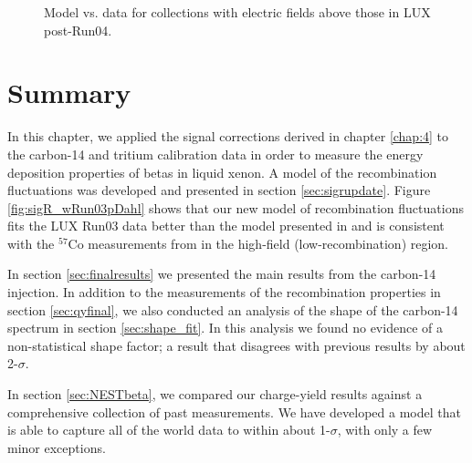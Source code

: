 \begin{figure}[!h]
\begin{subfigure}{0.5\linewidth}
\caption{}
\end{subfigure}
\caption{Model vs. data for collections with electric fields above those in LUX post-Run04.}
\label{fig:betamod_highfield}
\end{figure}

\clearpage
\section{Summary}
In this chapter, we applied the signal corrections derived in chapter \ref{chap:4} to the carbon-14 and tritium calibration data in order to measure the energy deposition properties of betas in liquid xenon. A model of the recombination fluctuations was developed and presented in section \ref{sec:sigrupdate}. Figure \ref{fig:sigR_wRun03pDahl} shows that our new model of recombination fluctuations fits the LUX Run03 data better than the model presented in \cite{attila} and is consistent with the $^{57}$Co measurements from \cite{dahl} in the high-field (low-recombination) region. 

In section \ref{sec:finalresults} we presented the main results from the carbon-14 injection. In addition to the measurements of the recombination properties in section \ref{sec:qyfinal}, we also conducted an analysis of the shape of the carbon-14 spectrum in section \ref{sec:shape_fit}. In this analysis we found no evidence of a non-statistical shape factor; a result that disagrees with previous results by about 2-$\sigma$\cite{C14_Kuzminov}.

In section \ref{sec:NESTbeta}, we compared our charge-yield results against a comprehensive collection of past measurements. We have developed a model that is able to capture all of the world data to within about 1-$\sigma$, with only a few minor exceptions.


